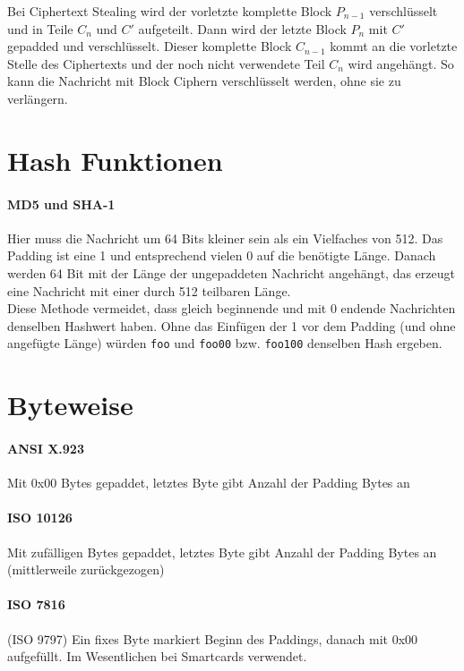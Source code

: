 Bei Ciphertext Stealing wird der vorletzte komplette Block $P_{n-1}$ verschlüsselt und in Teile $C_n$ und $C'$ aufgeteilt. 
Dann wird der letzte Block $P_n$ mit $C'$ gepadded und verschlüsselt. Dieser komplette Block $C_{n-1}$ kommt an die vorletzte Stelle des Ciphertexts und der noch nicht 
verwendete Teil $C_n$ wird angehängt. So kann die Nachricht mit Block Ciphern verschlüsselt werden, ohne sie zu verlängern.

\section{Hash Funktionen}

\paragraph{MD5 und SHA-1} Hier muss die Nachricht um 64 Bits kleiner sein als ein Vielfaches von 512.
Das Padding ist eine 1 und entsprechend vielen 0 auf die benötigte Länge. Danach werden 64 Bit mit der Länge der ungepaddeten Nachricht angehängt, das erzeugt eine 
Nachricht mit einer durch 512 teilbaren Länge. \\

\noindent Diese Methode vermeidet, dass gleich beginnende und mit 0 endende Nachrichten denselben
Hashwert haben. Ohne das Einfügen der 1 vor dem Padding (und ohne angefügte Länge)
würden \verb|foo| und \verb|foo00| bzw. \verb|foo100| denselben Hash ergeben.

\section{Byteweise}

\paragraph{ANSI X.923} Mit 0x00 Bytes gepaddet, letztes Byte gibt Anzahl der Padding Bytes an

\paragraph{ISO 10126} Mit zufälligen Bytes gepaddet, letztes Byte gibt Anzahl der Padding Bytes
an (mittlerweile zurückgezogen)

\paragraph{ISO 7816} (ISO 9797) Ein fixes Byte markiert Beginn des
Paddings, danach mit 0x00 aufgefüllt. Im Wesentlichen bei Smartcards
verwendet.

